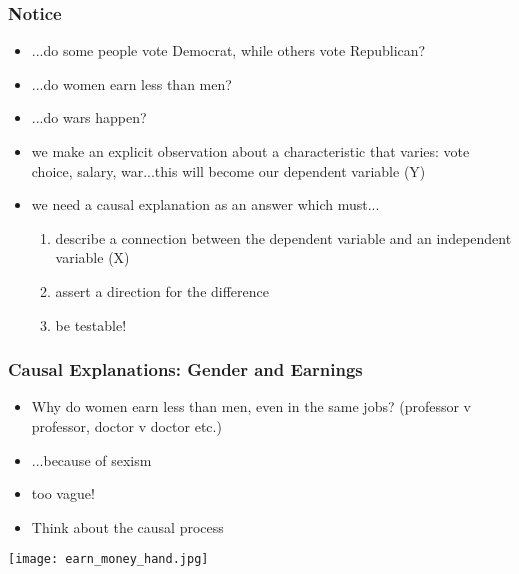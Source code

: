 \documentclass{beamer}
\begin{document}
\begin{frame}
 \frametitle{Notice}
 \begin{minipage}{.38\linewidth}
 \begin{itemize}
   \item ...do some people vote Democrat, while others vote Republican?
   \item ...do women earn less than men?
   \item ...do wars happen?
 \end{itemize}
 \end{minipage}\hfill
 \begin{minipage}{.58\linewidth}
 \begin{itemize}
   \item we make an explicit observation about a characteristic that varies: vote choice, salary, war...this will become our dependent variable (Y)
   \item we need a causal explanation as an answer which must...
      \begin{enumerate}
        \item describe a connection between the dependent variable and an independent variable (X)
        \item assert a direction for the difference
        \item be testable!
      \end{enumerate}
 \end{itemize}
 \end{minipage}
\end{frame}

\begin{frame}
 \frametitle<+->{Causal Explanations: Gender and Earnings}
 \begin{minipage}{.48\linewidth}
 \begin{itemize}[<+->]
   \item Why do women \alert{earn less} than men, even in the same jobs? (professor v professor, doctor v doctor etc.)
   \item ...because of \alert{sexism}
   \item too vague!
   \item Think about the causal process
 \end{itemize}
 \end{minipage}\hfill
 \begin{minipage}{.48\linewidth}
 \texttt{[image: earn\_money\_hand.jpg]}
 \end{minipage}
\end{frame}
\end{document}
